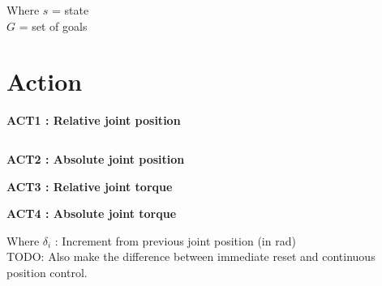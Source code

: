 \documentclass{article}
\begin{document}
Where
$s$ = state \\
$G$ = set of goals \\


\section{Action}


\textbf{ACT1 : Relative joint position}

\begin{equation}
[\delta_1, \delta_2, \delta_3, \delta_4, \delta_5, \delta_6]
\end{equation}

\textbf{ACT2 : Absolute joint position}

\textbf{ACT3 : Relative joint torque}

\textbf{ACT4 : Absolute joint torque}

Where
$\delta_i$ : Increment from previous joint position (in rad) \\

TODO: Also make the difference between immediate reset and continuous position control.
\end{document}
